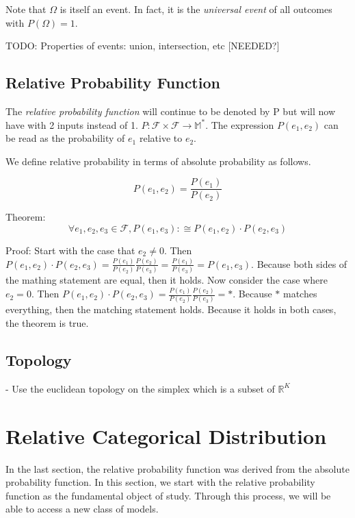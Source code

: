 \documentclass[twoside]{article}
\begin{document}
Note that \(\Omega\) is itself an event. In fact, it is the \textit{universal event} of all outcomes with \(P(\Omega) = 1\).

TODO: Properties of events: union, intersection, etc [NEEDED?]

\subsection{Relative Probability Function}

The \textit{relative probability function} will continue to be denoted by P but will now have with 2 inputs instead of 1. \(P: \mathcal{F} \times \mathcal{F} \rightarrow \mathbb{M}^*\). The expression \(P(e_1, e_2)\) can be read as the probability of \(e_1\) relative to \(e_2\).

We define relative probability in terms of absolute probability as follows.

\[P(e_1, e_2) = \frac{P(e_1)}{P(e_2)}\]

Theorem: \[\forall e_1, e_2, e_3 \in \mathcal{F}, P(e_1, e_3) :\cong P(e_1, e_2) \cdot P(e_2, e_3)\]

Proof: Start with the case that \(e_2 \neq 0\). Then \(P(e_1, e_2) \cdot P(e_2, e_3) = \frac{P(e_1)}{P(e_2)}\frac{P(e_2)}{P(e_3)} = \frac{P(e_1)}{P(e_3)} = P(e_1, e_3)\). Because both sides of the mathing statement are equal, then it holds.
Now consider the case where \(e_2 = 0\).  Then \(P(e_1, e_2) \cdot P(e_2, e_3) = \frac{P(e_1)}{P(e_2)}\frac{P(e_2)}{P(e_3)} = \ast\). Because \(\ast\) matches everything, then the matching statement holds. Because it holds in both cases, the theorem is true.

\subsection{Topology}

- Use the euclidean topology on the simplex which is a subset of \(\mathbb{R}^K\)

\section{Relative Categorical Distribution}

In the last section, the relative probability function was derived from the absolute probability function. In this section, we start with the relative probability function as the fundamental object of study. Through this process, we will be able to access a new class of models.
\end{document}

